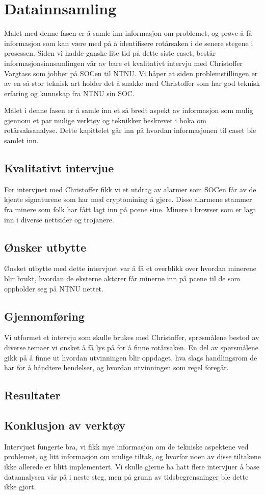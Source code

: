 \chapter{Datainnsamling}
Målet med denne fasen er å samle inn informasjon om problemet, og prøve å få informasjon som kan være med på å identifisere rotårsaken i de senere stegene i prosessen. Siden vi hadde ganske lite tid på dette siste caset, består informasjonsinnsamlingen vår av bare et kvalitativt intervju med Christoffer Vargtass som jobber på SOCen til NTNU. Vi håper at siden problemstillingen er av en så stor teknisk art holder det å snakke med Christoffer som har god teknisk erfaring og kunnskap fra NTNU sin SOC.

Målet i denne fasen er å samle inn et så bredt aspekt av informasjon som mulig gjennom et par mulige verktøy og teknikker beskrevet i boka om rotårsaksanalyse\cite{RCA}. Dette kapittelet går inn på hvordan informasjonen til caset ble samlet inn.

\section{Kvalitativt intervjue}
Før intervjuet med Christoffer fikk vi et utdrag av alarmer som SOCen får av de kjente signaturene som har med cryptomining å gjøre. Disse alarmene stammer fra minere som folk har fått lagt inn på pcene sine. Minere i browser som er lagt inn i diverse nettsider og trojanere. 

\section{Ønsker utbytte}
Ønsket utbytte med dette intervjuet var å få et overblikk over hvordan minerene blir brukt, hvordan de eksterne aktører får minerne inn på pcene til de som oppholder seg på NTNU nettet. 

\section{Gjennomføring}
Vi utformet et intervju som skulle brukes med Christoffer, sprøsmålene bestod av diverse temaer vi ønsket å få lys på for å finne rotårsaken. En del av spørsmålene gikk på å finne ut hvordan utvinningen blir oppdaget, hva slags handlingsrom de har for å håndtere hendelser, og hvordan utvinningen som regel foregår.
\section{Resultater}


\section{Konklusjon av verktøy}
Intervjuet fungerte bra, vi fikk mye informasjon om de tekniske aspektene ved problemet, og litt informasjon om mulige tiltak, og hvorfor noen av disse tiltakene ikke allerede er blitt implementert. Vi skulle gjerne ha hatt flere intervjuer å base dataanalysen vår på i neste steg, men på grunn av tidsbegrensninger ble dette ikke gjort.